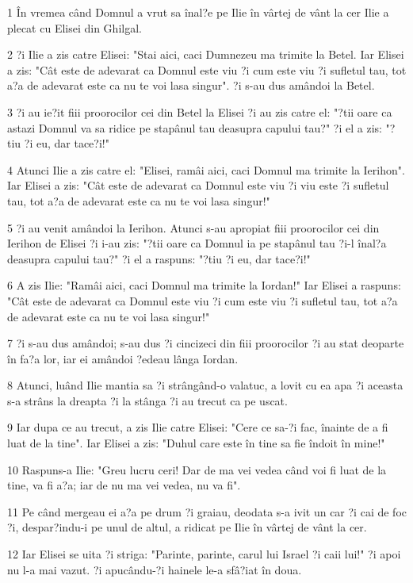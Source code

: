 \par 1 În vremea când Domnul a vrut sa înal?e pe Ilie în vârtej de vânt la cer Ilie a plecat cu Elisei din Ghilgal.
\par 2 ?i Ilie a zis catre Elisei: "Stai aici, caci Dumnezeu ma trimite la Betel. Iar Elisei a zis: "Cât este de adevarat ca Domnul este viu ?i cum este viu ?i sufletul tau, tot a?a de adevarat este ca nu te voi lasa singur". ?i s-au dus amândoi la Betel.
\par 3 ?i au ie?it fiii proorocilor cei din Betel la Elisei ?i au zis catre el: "?tii oare ca astazi Domnul va sa ridice pe stapânul tau deasupra capului tau?" ?i el a zis: "?tiu ?i eu, dar tace?i!"
\par 4 Atunci Ilie a zis catre el: "Elisei, ramâi aici, caci Domnul ma trimite la Ierihon". Iar Elisei a zis: "Cât este de adevarat ca Domnul este viu ?i viu este ?i sufletul tau, tot a?a de adevarat este ca nu te voi lasa singur!"
\par 5 ?i au venit amândoi la Ierihon. Atunci s-au apropiat fiii proorocilor cei din Ierihon de Elisei ?i i-au zis: "?tii oare ca Domnul ia pe stapânul tau ?i-l înal?a deasupra capului tau?" ?i el a raspuns: "?tiu ?i eu, dar tace?i!"
\par 6 A zis Ilie: "Ramâi aici, caci Domnul ma trimite la Iordan!" Iar Elisei a raspuns: "Cât este de adevarat ca Domnul este viu ?i cum este viu ?i sufletul tau, tot a?a de adevarat este ca nu te voi lasa singur!"
\par 7 ?i s-au dus amândoi; s-au dus ?i cincizeci din fiii proorocilor ?i au stat deoparte în fa?a lor, iar ei amândoi ?edeau lânga Iordan.
\par 8 Atunci, luând Ilie mantia sa ?i strângând-o valatuc, a lovit cu ea apa ?i aceasta s-a strâns la dreapta ?i la stânga ?i au trecut ca pe uscat.
\par 9 Iar dupa ce au trecut, a zis Ilie catre Elisei: "Cere ce sa-?i fac, înainte de a fi luat de la tine". Iar Elisei a zis: "Duhul care este în tine sa fie îndoit în mine!"
\par 10 Raspuns-a Ilie: "Greu lucru ceri! Dar de ma vei vedea când voi fi luat de la tine, va fi a?a; iar de nu ma vei vedea, nu va fi".
\par 11 Pe când mergeau ei a?a pe drum ?i graiau, deodata s-a ivit un car ?i cai de foc ?i, despar?indu-i pe unul de altul, a ridicat pe Ilie în vârtej de vânt la cer.
\par 12 Iar Elisei se uita ?i striga: "Parinte, parinte, carul lui Israel ?i caii lui!" ?i apoi nu l-a mai vazut. ?i apucându-?i hainele le-a sfâ?iat în doua.
